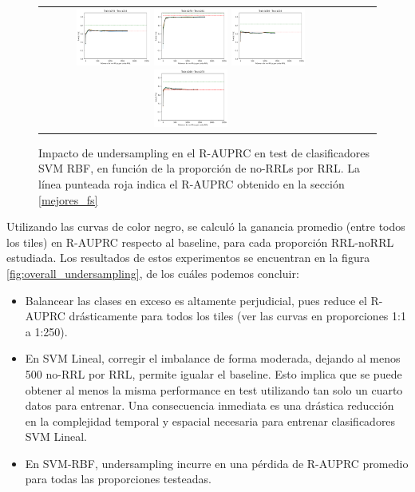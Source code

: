 \begin{figure}[h!]
\begin{tabular}{cccc}
\includegraphics[width=0.25\textwidth]{Kap7/train=b278_test=b234_rbf_individual_curves.png}  \includegraphics[width=0.25\textwidth]{Kap7/train=b278_test=b261_rbf_individual_curves.png} 
 \includegraphics[width=0.25\textwidth]{Kap7/train=b360_test=b234_rbf_individual_curves.png}  \includegraphics[width=0.25\textwidth]{Kap7/train=b360_test=b278_rbf_individual_curves.png} 
\end{tabular}
\caption{Impacto de undersampling en el R-AUPRC en test de clasificadores SVM RBF, en función de la proporción de no-RRLs por RRL. La línea punteada roja indica el R-AUPRC obtenido en la sección \protect\ref{mejores_fs}}
\label{fig:svmk_undersample}
\end{figure}

Utilizando las curvas de color negro, se calculó la ganancia promedio (entre todos los tiles) en R-AUPRC respecto al baseline, para cada proporción RRL-noRRL estudiada. Los resultados de estos experimentos se encuentran en la figura \ref{fig:overall_undersampling}, de los cuáles podemos concluir:
\begin{itemize}
\item Balancear las clases en exceso es altamente perjudicial, pues reduce el R-AUPRC drásticamente para todos los tiles (ver las curvas en proporciones 1:1 a 1:250).
\item En SVM Lineal, corregir el imbalance de forma moderada, dejando al menos 500 no-RRL por RRL, permite igualar el baseline. Esto implica que se puede obtener al menos la misma performance en test utilizando tan solo un cuarto datos para entrenar. Una consecuencia inmediata es una drástica reducción en la complejidad temporal y espacial necesaria para entrenar clasificadores SVM Lineal.
\item En SVM-RBF, undersampling incurre en una pérdida de R-AUPRC promedio para todas las proporciones testeadas.
\end{itemize}

